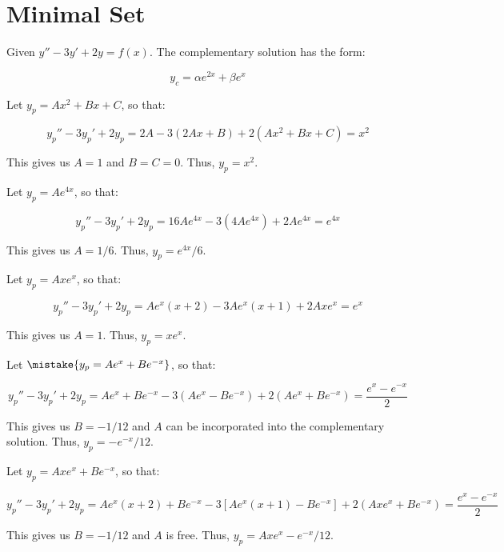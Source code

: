 \documentclass[12pt]{article}
\begin{document}



\pagebreak
\section*{Minimal Set}


Given $y'' - 3y' + 2y = f(x)$. The complementary solution has the form:

\begin{equation}
    y_{c} = \alpha e^{2x} + \beta e^{x}
\end{equation}

Let $y_{p} = Ax^{2} + Bx + C$, so that:

\begin{equation}
    y_{p}'' - 3y_{p}' + 2y_{p} = 2A - 3(2Ax + B) + 2(Ax^{2} + Bx + C) = x^{2}
\end{equation}

This gives us $A = 1$ and $B = C = 0$. Thus, $y_{p} = x^{2}$.

Let $y_{p} = Ae^{4x}$, so that:

\begin{equation}
    y_{p}'' - 3y_{p}' + 2y_{p} = 16Ae^{4x} - 3(4Ae^{4x}) + 2Ae^{4x} = e^{4x}
\end{equation}

This gives us $A = 1/6$. Thus, $y_{p} = e^{4x}/6$.

Let $y_{p} = Axe^{x}$, so that:

\begin{equation}
    y_{p}'' - 3y_{p}' + 2y_{p} = Ae^{x}(x + 2) - 3Ae^{x}(x + 1) + 2Axe^{x} = e^{x}
\end{equation}

This gives us $A = 1$. Thus, $y_{p} = xe^{x}$.

Let $\mistake{y_{p} = Ae^{x} + Be^{-x}}$, so that:

\begin{equation}
    y_{p}'' - 3y_{p}' + 2y_{p} = Ae^{x} + Be^{-x} - 3(Ae^{x} - Be^{-x}) + 2(Ae^{x} + Be^{-x}) = \frac{e^{x} - e^{-x}}{2}
\end{equation}

This gives us $B = -1/12$ and $A$ can be incorporated into the complementary solution. Thus, $y_{p} = -e^{-x}/12$.

\begin{correction}
    Let $y_{p} = Axe^{x} + Be^{-x}$, so that:

    \begin{equation}
        y_{p}'' - 3y_{p}' + 2y_{p} = Ae^{x}(x + 2) + Be^{-x} - 3[Ae^{x}(x + 1) - Be^{-x}] + 2(Axe^{x} + Be^{-x}) = \frac{e^{x} - e^{-x}}{2}
    \end{equation}

    This gives us $B = -1/12$ and $A$ is free. Thus, $y_{p} = Axe^{x} - e^{-x}/12$.
\end{correction}
\end{document}
